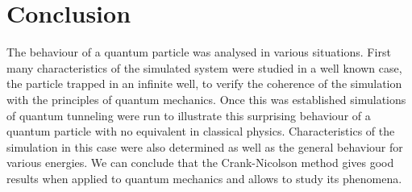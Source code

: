 \section{Conclusion}
The behaviour of a quantum particle was analysed in various situations. First many characteristics of the simulated system were studied in a well known case, the particle trapped in an infinite well, to verify the coherence of the simulation with the principles of quantum mechanics. Once this was established simulations of quantum tunneling were run to illustrate this surprising behaviour of a quantum particle with no equivalent in classical physics. Characteristics of the simulation in this case were also determined as well as the general behaviour for various energies. We can conclude that the Crank-Nicolson method gives good results when applied to quantum mechanics and allows to study its phenomena.
